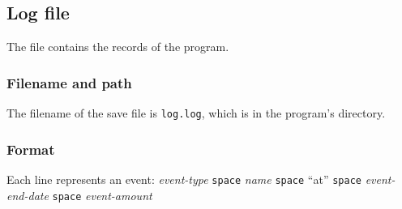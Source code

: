 \subsection{Log file}
The file contains the records of the program.

\subsubsection{Filename and path}
The filename of the save file is \texttt{log.log}, which is in the program's directory.

\subsubsection{Format}
Each line represents an event: \emph{event-type} \texttt{space} \emph{name} \texttt{space} ``at'' \texttt{space} \emph{event-end-date} \texttt{space} \emph{event-amount} 